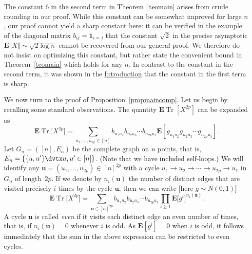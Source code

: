 \documentclass[aop,MSNbibl,dvips]{arximspdf}
\newcommand{\rrVert}{\Vert}
\newcommand{\llVert}{\Vert}
\newcommand{\EE}{\mathbf{E}}
\newcommand{\Tr}{\operatorname{Tr}}
\begin{document}
%
\begin{rem}
The constant $6$ in the second term in Theorem~\ref{teomain} arises
from crude rounding in our proof. While this constant can be somewhat
improved for large $n$, our proof cannot yield a sharp constant here:
it can be verified in the example of the diagonal matrix
$b_{ij}=\mathbf{1}_{i=j}$ that the constant $\sqrt{2}$ in the
precise asymptotic $\EE\llVert X\rrVert \sim\sqrt{2\log n}$ cannot be
recovered
from our general proof. We therefore do not insist on optimizing this
constant, but rather state the convenient bound in
Theorem~\ref{teomain} which holds for any $n$. In contrast to the
constant in the second term, it was shown in the \hyperref[sec1]{Introduction} that the
constant in the first term is sharp.
\end{rem}

We now turn to the proof of Proposition~\ref{propmaincomp}. Let us begin
by recalling some standard observations. The quantity $\EE\Tr[X^{2p}]$
can be expanded as
%
\[
\EE\Tr\bigl[X^{2p}\bigr] = \sum_{u_1,\ldots,u_{2p}\in[n]}
b_{u_1u_2}b_{u_2u_3}\cdots b_{u_{2p}u_1} \EE[g_{u_1u_2}g_{u_2u_3}
\cdots g_{u_{2p}u_1}]. %
\]
%
Let $G_n=([n],E_n)$ be the complete graph on $n$ points, that is,
$E_n=\{\{u,u'\}\dvtx\break  u,u'\in[n]\}$. (Note that we have included self-loops.)
We will identify any $\mathbf{u}=(u_1,\ldots,u_{2p})\in[n]^{2p}$
with a
cycle $u_1\to u_2\to\cdots\to u_{2p}\to u_1$ in $G_n$ of length~$2p$.
If we denote by $n_i(\mathbf{u})$ the number of distinct edges that are
visited precisely $i$ times by the cycle $\mathbf{u}$, then we can write
[here $g\sim N(0,1)$]
%
\[
\EE\Tr\bigl[X^{2p}\bigr] = \sum_{\mathbf{u}\in[n]^{2p}}
b_{u_1u_2}b_{u_2u_3}\cdots b_{u_{2p}u_1} \prod
_{i\ge1}\EE\bigl[g^{i}\bigr]^{n_i(\mathbf{u})}.
%
\]
%
A cycle $\mathbf{u}$ is called \emph{even} if it visits each distinct edge
an even number of times, that is, if $n_i(\mathbf{u})=0$ whenever $i$ is
odd. As $\EE[g^i]=0$ when $i$ is odd, it follows immediately that the sum
in the above expression can be restricted to even cycles.
\end{document}
